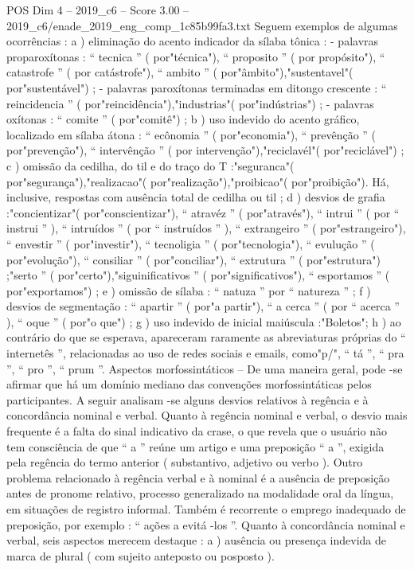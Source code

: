 \begin{textsample}{POS Dim 4 – 2019\_c6 – Score 3.00 – 2019\_c6/enade\_2019\_eng\_comp\_1c85b99fa3.txt}
Seguem exemplos de algumas ocorrências : a ) eliminação do acento indicador da sílaba tônica : - palavras proparoxítonas : “ tecnica ” ( por"técnica"), “ proposito ” ( por propósito"), “ catastrofe ” ( por catástrofe"), “ ambito ” ( por"âmbito"),"sustentavel"( por"sustentável") ; - palavras paroxítonas terminadas em ditongo crescente : “ reincidencia ” ( por"reincidência"),"industrias"( por"indústrias") ; - palavras oxítonas : “ comite ” ( por"comitê") ; b ) uso indevido do acento gráfico, localizado em sílaba átona : “ ecônomia ” ( por"economia"), “ prevênção ” ( por"prevenção"), “ intervênção ” ( por intervenção"),"reciclavél"( por"reciclável") ; c ) omissão da cedilha, do til e do traço do T :"seguranca"( por"segurança"),"realizacao"( por"realização"),"proibicao"( por"proibição").
Há, inclusive, respostas com ausência total de cedilha ou til ; d ) desvios de grafia :"concientizar"( por"conscientizar"), “ atravéz ” ( por"através"), “ intrui ” ( por “ instrui ” ), “ intruídos ” ( por “ instruídos ” ), “ extrangeiro ” ( por"estrangeiro"), “ envestir ” ( por"investir"), “ tecnoligia ” ( por"tecnologia"), “ evulução ” ( por"evolução"), “ consiliar ” ( por"conciliar"), “ extrutura ” ( por"estrutura") ;"serto ” ( por"certo"),"siguinificativos ” ( por"significativos"), “ esportamos ” ( por"exportamos") ; e ) omissão de sílaba : “ natuza ” por “ natureza ” ; f ) desvios de segmentação : “ apartir ” ( por"a partir"), “ a cerca ” ( por “ acerca ” ), “ oque ” ( por"o que") ; g ) uso indevido de inicial maiúscula :"Boletos"; h ) ao contrário do que se esperava, apareceram raramente as abreviaturas próprias do “ internetês ”, relacionadas ao uso de redes sociais e emails, como"p/", “ tá ”, “ pra ”, “ pro ”, “ prum ”.
Aspectos morfossintáticos – De uma maneira geral, pode -se afirmar que há um domínio mediano das convenções morfossintáticas pelos participantes.
A seguir analisam -se alguns desvios relativos à regência e à concordância nominal e verbal.
Quanto à regência nominal e verbal, o desvio mais frequente é a falta do sinal indicativo da crase, o que revela que o usuário não tem consciência de que “ a ” reúne um artigo e uma preposição “ a ”, exigida pela regência do termo anterior ( substantivo, adjetivo ou verbo ).
Outro problema relacionado à regência verbal e à nominal é a ausência de preposição antes de pronome relativo, processo generalizado na modalidade oral da língua, em situações de registro informal.
Também é recorrente o emprego inadequado de preposição, por exemplo : “ ações a evitá -los ”.
Quanto à concordância nominal e verbal, seis aspectos merecem destaque : a ) ausência ou presença indevida de marca de plural ( com sujeito anteposto ou posposto ).

\end{textsample}
